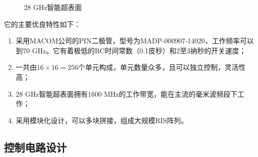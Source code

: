 \documentclass[supercite]{HustGraduPaper}
\begin{document}
\begin{figure}[htb]
	\centering
	\hfil
	\hfil
	\caption{28 GHz智能超表面}
	\label{fig:28-GHz-RIS}
\end{figure}

它的主要优良特性如下：
\begin{enumerate}
	\item 采用MACOM公司的PIN二极管，型号为MADP-000907-14020，工作频率可以到70 GHz。它有着极低的RC时间常数（0.1皮秒）和2至3纳秒的开关速度；
	\item 一共由$16\times16=256$个单元构成，单元数量众多，且可以独立控制，灵活性高；
	\item 28 GHz智能超表面拥有1600 MHz的工作带宽，能在主流的毫米波频段下工作；
	\item 采用模块化设计，可以多块拼接，组成大规模RIS阵列。
\end{enumerate}

\subsection{控制电路设计}
\end{document}
